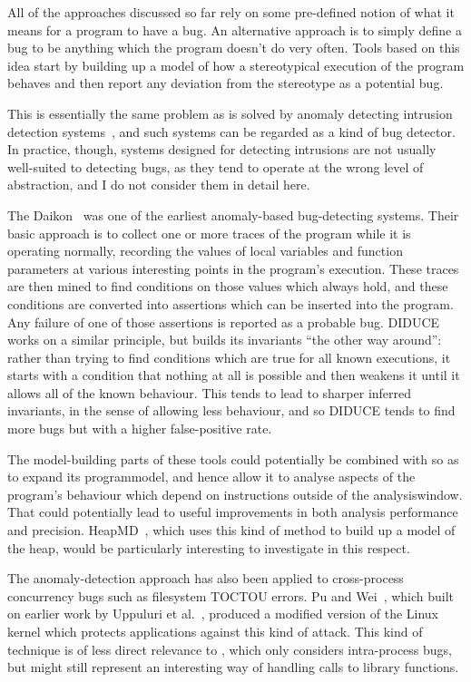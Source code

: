 All of the approaches discussed so far rely on some pre-defined notion
of what it means for a program to have a bug.  An alternative approach
is to simply define a bug to be anything which the program doesn't do
very often.  Tools based on this idea start by building up a model of
how a stereotypical execution of the program behaves and then report
any deviation from the stereotype as a potential bug.

This is essentially the same problem as is solved by anomaly detecting
intrusion detection systems~\cite{Forrest1996a}, and such systems can
be regarded as a kind of bug detector.  In practice, though, systems
designed for detecting intrusions are not usually well-suited to
detecting bugs, as they tend to operate at the wrong level of
abstraction, and I do not consider them in detail here.

The Daikon~\cite{Ernst2007} was one of the earliest anomaly-based
bug-detecting systems.  Their basic approach is to collect one or more
traces of the program while it is operating normally, recording the
values of local variables and function parameters at various
interesting points in the program's execution.  These traces are then
mined to find conditions on those values which always hold, and these
conditions are converted into assertions which can be inserted into
the program.  Any failure of one of those assertions is reported as a
probable bug.  DIDUCE~\cite{Hangal2002} works on a similar principle,
but builds its invariants ``the other way around'': rather than trying
to find conditions which are true for all known executions, it starts
with a condition that nothing at all is possible and then weakens it
until it allows all of the known behaviour.  This tends to lead to
sharper inferred invariants, in the sense of allowing less behaviour,
and so DIDUCE tends to find more bugs but with a higher false-positive
rate.

The model-building parts of these tools could potentially be combined
with {\technique} so as to expand its \gls{programmodel}, and hence
allow it to analyse aspects of the program's behaviour which depend on
instructions outside of the \gls{analysiswindow}.  That could
potentially lead to useful improvements in both analysis performance
and precision.  HeapMD~\cite{Chilimbi2006}, which uses this kind of
method to build up a model of the heap, would be particularly
interesting to investigate in this respect.

The anomaly-detection approach has also been applied to cross-process
concurrency bugs such as filesystem TOCTOU
errors\cite[pages~44--45]{Apple2012SecureCoding}.  Pu and
Wei~\cite{Pu2006}, which built on earlier work by Uppuluri et
al.~\cite{Uppuluri2005}, produced a modified version of the Linux
kernel which protects applications against this kind of attack.  This
kind of technique is of less direct relevance to {\technique}, which
only considers intra-process bugs, but might still represent an
interesting way of handling calls to library functions.

